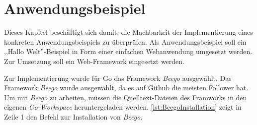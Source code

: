 \chapter{Anwendungsbeispiel}
Dieses Kapitel beschäftigt sich damit, die Machbarkeit der Implementierung eines konkreten Anwendungsbeispiels zu überprüfen.
Als Anwendungsbeispiel soll ein ,,Hallo Welt''-Beispiel in Form einer einfachen Webanwendung umgesetzt werden.
Zur Umsetzung soll ein Web-Framework eingesetzt werden.





Zur Implementierung wurde für Go das Framework \textit{Beego}\cite{Beego} ausgewählt.
Das Framework \textit{Beego} wurde ausgewählt, da es auf Github die meisten Follower hat.
Um mit \textit{Beego} zu arbeiten, müssen die Quelltext-Dateien des Framworks in den eigenen \textit{Go-Workspace} heruntergeladen werden.
\autoref{lst:BeegoInstallation} zeigt in Zeile 1 den Befehl zur Installation von \textit{Beego}.

